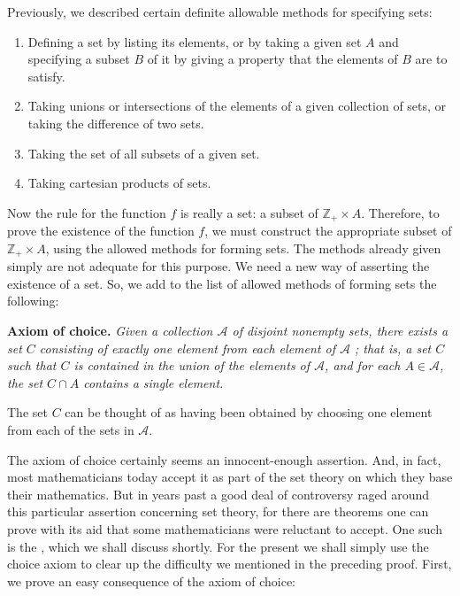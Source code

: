 Previously, we described certain definite allowable methods for specifying sets:
\begin{enumerate}[itemsep=0.2em, parsep=0pt, topsep=0pt, partopsep=0pt, leftmargin=*, label=(\arabic*), align=left]
 \item Defining a set by listing its elements, or by taking a given set \(A\) and specifying a subset \(B\) of it by giving a property that the elements of \(B\) are to satisfy.

 \item Taking unions or intersections of the elements of a given collection of sets, or taking the difference of two sets.

 \item Taking the set of all subsets of a given set.

 \item Taking cartesian products of sets.
\end{enumerate}
Now the rule for the function \(f\) is really a set: a subset of \(\mathbb{Z}_{+} \times A\). 
Therefore, to prove the existence of the function \(f\), we must construct the appropriate 
subset of \(\mathbb{Z}_{+} \times A\), using the allowed methods for forming sets. 
The methods already given simply are not adequate for this purpose. We need a new way 
of asserting the existence of a set. So, we add to the list of allowed methods of forming sets the following:

\noindent \textbf{Axiom of choice.} \textsl{
 Given a collection \(\mathcal{A}\) of disjoint nonempty sets, there exists a set \(C\) consisting 
 of exactly one element from each element of \(\mathcal{A}\) ; that is, a set \(C\) such that \(C\) 
 is contained in the union of the elements of \(\mathcal{A}\), and for each \(A \in \mathcal{A}\), 
 the set \(C \cap A\) contains a single element.
}

The set \(C\) can be thought of as having been obtained by choosing one element 
from each of the sets in \(\mathcal{A}\).

The axiom of choice certainly seems an innocent-enough assertion. 
And, in fact, most mathematicians today accept it as part of the set theory 
on which they base their mathematics. But in years past a good deal of controversy 
raged around this particular assertion concerning set theory, for there are theorems 
one can prove with its aid that some mathematicians were reluctant to accept. 
One such is the , which we shall discuss shortly. 
For the present we shall simply use the choice axiom to clear up the difficulty 
we mentioned in the preceding proof. First, we prove an easy consequence of the 
axiom of choice:

